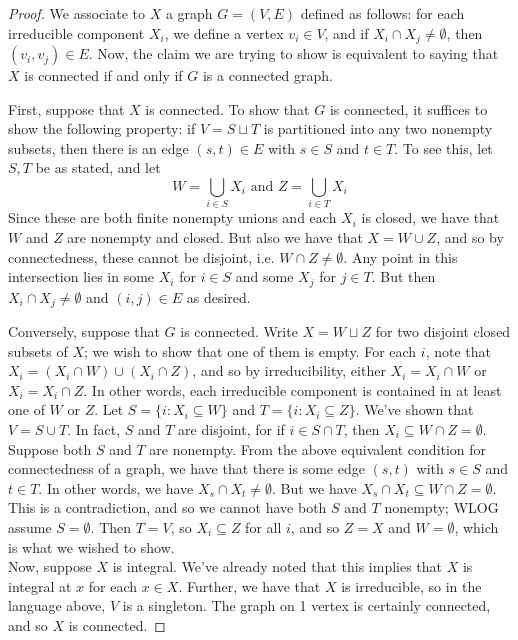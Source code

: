 \begin{proof}
	We associate to $X$ a graph $G = (V,E)$ defined as follows: for each irreducible component $X_i$, we define a vertex $v_i \in V$, and if $X_i \cap X_j \neq \emptyset$, then $(v_i,v_j) \in E$. Now, the claim we are trying to show is equivalent to saying that $X$ is connected if and only if $G$ is a connected graph.
	
	First, suppose that $X$ is connected. To show that $G$ is connected, it suffices to show the following property: if $V = S \sqcup T$ is partitioned into any two nonempty subsets, then there is an edge $(s,t) \in E$ with $s \in S$ and $t \in T$. To see this, let $S,T$ be as stated, and let
	\[ W = \bigcup_{i \in S} X_i \text{ and } Z = \bigcup_{i \in T} X_i \]
	Since these are both finite nonempty unions and each $X_i$ is closed, we have that $W$ and $Z$ are nonempty and closed. But also we have that $X = W \cup Z$, and so by connectedness, these cannot be disjoint, i.e. $W \cap Z \neq \emptyset$. Any point in this intersection lies in some $X_i$ for $i \in S$ and some $X_j$ for $j \in T$. But then $X_i \cap X_j \neq \emptyset$ and $(i,j) \in E$ as desired.
	
	Conversely, suppose that $G$ is connected. Write $X = W \sqcup Z$ for two disjoint closed subsets of $X$; we wish to show that one of them is empty. For each $i$, note that $X_i = (X_i \cap W) \cup (X_i \cap Z)$, and so by irreducibility, either $X_i = X_i \cap W$ or $X_i = X_i \cap Z$. In other words, each irreducible component is contained in at least one of $W$ or $Z$. Let $S = \{ i : X_i \subseteq W \}$ and $T = \{ i : X_i \subseteq Z \}$. We've shown that $V = S \cup T$. In fact, $S$ and $T$ are disjoint, for if $i \in S \cap T$, then $X_i \subseteq W \cap Z = \emptyset$. Suppose both $S$ and $T$ are nonempty. From the above equivalent condition for connectedness of a graph, we have that there is some edge $(s,t)$ with $s \in S$ and $t \in T$. In other words, we have $X_s \cap X_t \neq \emptyset$. But we have $X_s \cap X_t \subseteq W \cap Z = \emptyset$. This is a contradiction, and so we cannot have both $S$ and $T$ nonempty; WLOG assume $S = \emptyset$. Then $T = V$, so $X_i \subseteq Z$ for all $i$, and so $Z = X$ and $W = \emptyset$, which is what we wished to show. \\
	
	Now, suppose $X$ is integral. We've already noted that this implies that $X$ is integral at $x$ for each $x \in X$. Further, we have that $X$ is irreducible, so in the language above, $V$ is a singleton. The graph on 1 vertex is certainly connected, and so $X$ is connected.
	

\end{proof}
